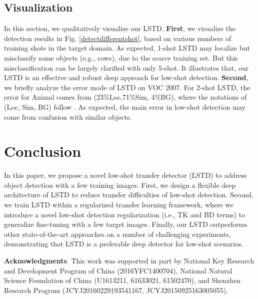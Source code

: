 \documentclass[letterpaper]{article} \usepackage{aaai18}  \usepackage{times}  \usepackage{helvet}  \usepackage{courier}  \usepackage{url}  \usepackage{graphicx}
\begin{document}
\subsection{Visualization}

In this section,
we qualitatively visualize our LSTD.
\textbf{First},
we visualize the detection results in Fig. \ref{detectdifferentshot},
based on various numbers of training shots in the target domain.
As expected,
1-shot LSTD may localize but misclassify some objects (e.g., cows),
due to the scarce training set.
But this misclassification can be largely clarified with only 5-shot.
It illustrates that,
our LSTD is an effective and robust deep approach for low-shot detection.
\textbf{Second},
we briefly analyze the error mode of LSTD on VOC 2007.
For 2-shot LSTD,
the error for Animal comes from (23\%Loc,71\%Sim, 4\%BG),
where the notations of (Loc, Sim, BG) follow \cite{Girshick2014}.
As expected,
the main error in low-shot detection may come from confusion with similar objects.


\section{Conclusion}
In this paper,
we propose a novel low-shot transfer detector (LSTD) to address object detection with a few training images.
First,
we design a flexible deep architecture of LSTD to reduce transfer difficulties of low-shot detection.
Second,
we train LSTD within a regularized transfer learning framework,
where we introduce a novel low-shot detection regularization (i.e., TK and BD terms) to generalize fine-tuning with a few target images.
Finally,
our LSTD outperforms other state-of-the-art approaches on a number of challenging experiments,
demonstrating that LSTD is a preferable deep detector for low-shot scenarios.



\textbf{Acknowledgments}.
This work was supported in part by National Key Research and Development Program of China (2016YFC1400704),
National Natural Science Foundation of China (U1613211, 61633021, 61502470),
and Shenzhen Research Program (JCYJ20160229193541167, JCYJ20150925163005055).







\end{document}
